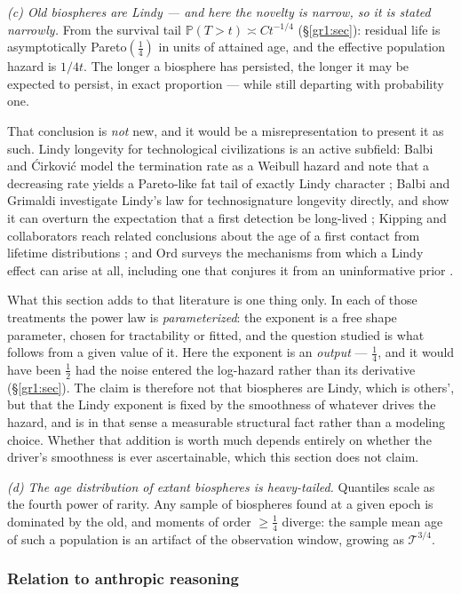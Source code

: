 \documentclass[11pt]{article}
\numberwithin{equation}{section}
\theoremstyle{plain}
\theoremstyle{definition}
\theoremstyle{remark}
\newcommand{\PP}{\mathbb{P}}
\begin{document}
\emph{(c) Old biospheres are Lindy --- and here the novelty is narrow,
so it is stated narrowly.} From the survival tail
$\PP(T>t)\asymp Ct^{-1/4}$ (\S\ref{gr1:sec}): residual life is
asymptotically Pareto$(\tfrac14)$ in units of attained age, and the
effective population hazard is $1/4t$. The longer a biosphere has
persisted, the longer it may be expected to persist, in exact
proportion --- while still departing with probability one.

That conclusion is \emph{not} new, and it would be a misrepresentation
to present it as such. Lindy longevity for technological civilizations
is an active subfield: Balbi and \'Cirkovi\'c model the termination rate
as a Weibull hazard and note that a decreasing rate yields a
Pareto-like fat tail of exactly Lindy character \cite{BC21}; Balbi and
Grimaldi investigate Lindy's law for technosignature longevity directly,
and show it can overturn the expectation that a first detection be
long-lived \cite{BG24}; Kipping and collaborators reach related
conclusions about the age of a first contact from lifetime distributions
\cite{Kip20}; and Ord surveys the mechanisms from which a Lindy effect
can arise at all, including one that conjures it from an uninformative
prior \cite{Ord23,Tal12}.

What this section adds to that literature is one thing only. In each of
those treatments the power law is \emph{parameterized}: the exponent is
a free shape parameter, chosen for tractability or fitted, and the
question studied is what follows from a given value of it. Here the
exponent is an \emph{output} --- $\tfrac14$, and it would have been
$\tfrac12$ had the noise entered the log-hazard rather than its
derivative (\S\ref{gr1:sec}). The claim is therefore not that biospheres are
Lindy, which is others', but that the Lindy exponent is fixed by the
smoothness of whatever drives the hazard, and is in that sense a
measurable structural fact rather than a modeling choice. Whether that
addition is worth much depends entirely on whether the driver's
smoothness is ever ascertainable, which this section does not claim.

\emph{(d) The age distribution of extant biospheres is heavy-tailed.}
Quantiles scale as the fourth power of rarity. Any sample of biospheres
found at a given epoch is dominated by the old, and moments of order
$\ge\tfrac14$ diverge: the sample mean age of such a population is an
artifact of the observation window, growing as $\mathcal T^{3/4}$.

\subsubsection{Relation to anthropic reasoning}\label{gr:subsub:anthropic}
\end{document}
